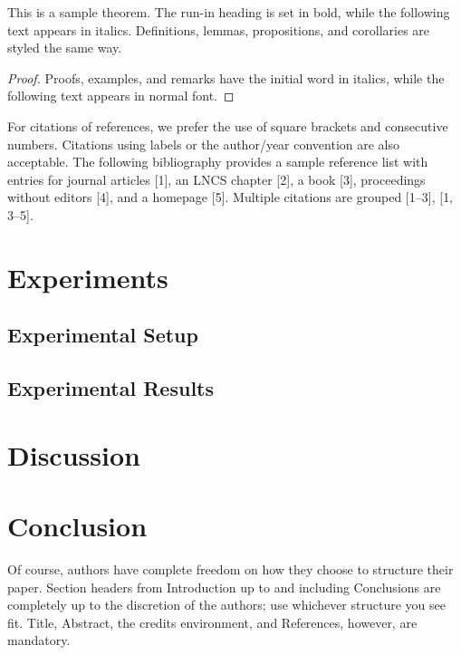\documentclass[runningheads]{llncs}
\begin{document}
\begin{theorem}
This is a sample theorem. The run-in heading is set in bold, while
the following text appears in italics. Definitions, lemmas,
propositions, and corollaries are styled the same way.
\end{theorem}

\begin{proof}
Proofs, examples, and remarks have the initial word in italics,
while the following text appears in normal font.
\end{proof}

For citations of references, we prefer the use of square brackets and
consecutive numbers. Citations using labels or the author/year
convention are also acceptable. The following bibliography provides a
sample reference list with entries for journal articles {[}1{]}, an LNCS
chapter {[}2{]}, a book {[}3{]}, proceedings without editors {[}4{]},
and a homepage {[}5{]}. Multiple citations are grouped {[}1--3{]}, {[}1,
3--5{]}.

\section{Experiments}\label{experiments}

\subsection{Experimental Setup}\label{experimental-setup}

\subsection{Experimental Results}\label{experimental-results}

\section{Discussion}\label{discussion}

\section{Conclusion}\label{conclusion}

Of course, authors have complete freedom on how they choose to structure
their paper. Section headers from Introduction up to and including
Conclusions are completely up to the discretion of the authors; use
whichever structure you see fit. Title, Abstract, the credits
environment, and References, however, are mandatory.
\end{document}
